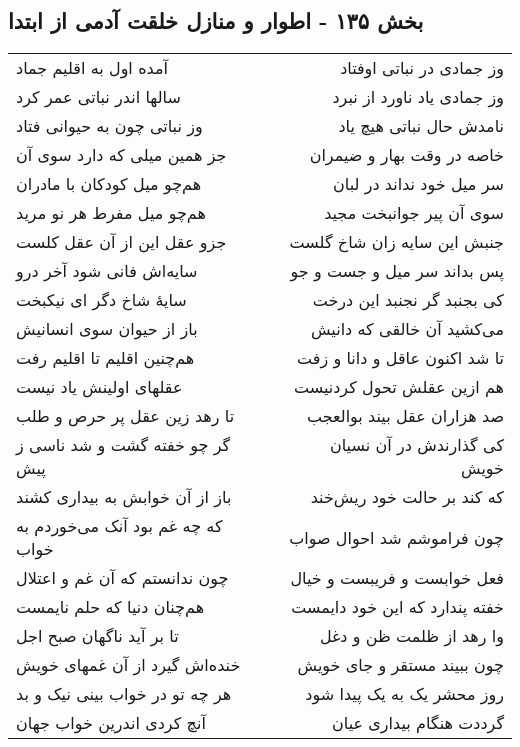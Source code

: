 \begin{center}
\section*{بخش ۱۳۵ - اطوار و منازل خلقت آدمی از ابتدا}
\label{sec:sh135}
\begin{longtable}{l p{0.5cm} r}
آمده اول به اقلیم جماد
&&
وز جمادی در نباتی اوفتاد
\\
سالها اندر نباتی عمر کرد
&&
وز جمادی یاد ناورد از نبرد
\\
وز نباتی چون به حیوانی فتاد
&&
نامدش حال نباتی هیچ یاد
\\
جز همین میلی که دارد سوی آن
&&
خاصه در وقت بهار و ضیمران
\\
هم‌چو میل کودکان با مادران
&&
سر میل خود نداند در لبان
\\
هم‌چو میل مفرط هر نو مرید
&&
سوی آن پیر جوانبخت مجید
\\
جزو عقل این از آن عقل کلست
&&
جنبش این سایه زان شاخ گلست
\\
سایه‌اش فانی شود آخر درو
&&
پس بداند سر میل و جست و جو
\\
سایهٔ شاخ دگر ای نیکبخت
&&
کی بجنبد گر نجنبد این درخت
\\
باز از حیوان سوی انسانیش
&&
می‌کشید آن خالقی که دانیش
\\
هم‌چنین اقلیم تا اقلیم رفت
&&
تا شد اکنون عاقل و دانا و زفت
\\
عقلهای اولینش یاد نیست
&&
هم ازین عقلش تحول کردنیست
\\
تا رهد زین عقل پر حرص و طلب
&&
صد هزاران عقل بیند بوالعجب
\\
گر چو خفته گشت و شد ناسی ز پیش
&&
کی گذارندش در آن نسیان خویش
\\
باز از آن خوابش به بیداری کشند
&&
که کند بر حالت خود ریش‌خند
\\
که چه غم بود آنک می‌خوردم به خواب
&&
چون فراموشم شد احوال صواب
\\
چون ندانستم که آن غم و اعتلال
&&
فعل خوابست و فریبست و خیال
\\
هم‌چنان دنیا که حلم نایمست
&&
خفته پندارد که این خود دایمست
\\
تا بر آید ناگهان صبح اجل
&&
وا رهد از ظلمت ظن و دغل
\\
خنده‌اش گیرد از آن غمهای خویش
&&
چون ببیند مستقر و جای خویش
\\
هر چه تو در خواب بینی نیک و بد
&&
روز محشر یک به یک پیدا شود
\\
آنچ کردی اندرین خواب جهان
&&
گرددت هنگام بیداری عیان
\\

\end{longtable}
\end{center}

